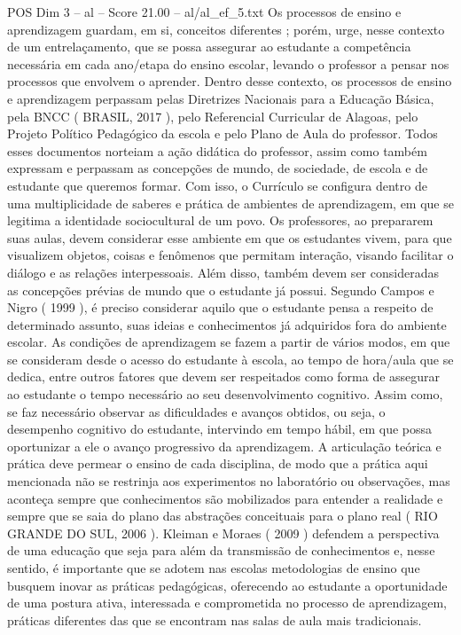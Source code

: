\begin{textsample}{POS Dim 3 – al – Score 21.00 – al/al\_ef\_5.txt}
Os processos de ensino e aprendizagem guardam, em si, conceitos diferentes ; porém, urge, nesse contexto de um entrelaçamento, que se possa assegurar ao estudante a competência necessária em cada ano/etapa do ensino escolar, levando o professor a pensar nos processos que envolvem o aprender.
Dentro desse contexto, os processos de ensino e aprendizagem perpassam pelas Diretrizes Nacionais para a Educação Básica, pela BNCC ( BRASIL, 2017 ), pelo Referencial Curricular de Alagoas, pelo Projeto Político Pedagógico da escola e pelo Plano de Aula do professor.
Todos esses documentos norteiam a ação didática do professor, assim como também expressam e perpassam as concepções de mundo, de sociedade, de escola e de estudante que queremos formar.
Com isso, o Currículo se configura dentro de uma multiplicidade de saberes e prática de ambientes de aprendizagem, em que se legitima a identidade sociocultural de um povo.
Os professores, ao prepararem suas aulas, devem considerar esse ambiente em que os estudantes vivem, para que visualizem objetos, coisas e fenômenos que permitam interação, visando facilitar o diálogo e as relações interpessoais.
Além disso, também devem ser consideradas as concepções prévias de mundo que o estudante já possui.
Segundo Campos e Nigro ( 1999 ), é preciso considerar aquilo que o estudante pensa a respeito de determinado assunto, suas ideias e conhecimentos já adquiridos fora do ambiente escolar.
As condições de aprendizagem se fazem a partir de vários modos, em que se consideram desde o acesso do estudante à escola, ao tempo de hora/aula que se dedica, entre outros fatores que devem ser respeitados como forma de assegurar ao estudante o tempo necessário ao seu desenvolvimento cognitivo.
Assim como, se faz necessário observar as dificuldades e avanços obtidos, ou seja, o desempenho cognitivo do estudante, intervindo em tempo hábil, em que possa oportunizar a ele o avanço progressivo da aprendizagem.
A articulação teórica e prática deve permear o ensino de cada disciplina, de modo que a prática aqui mencionada não se restrinja aos experimentos no laboratório ou observações, mas aconteça sempre que conhecimentos são mobilizados para entender a realidade e sempre que se saia do plano das abstrações conceituais para o plano real ( RIO GRANDE DO SUL, 2006 ).
Kleiman e Moraes ( 2009 ) defendem a perspectiva de uma educação que seja para além da transmissão de conhecimentos e, nesse sentido, é importante que se adotem nas escolas metodologias de ensino que busquem inovar as práticas pedagógicas, oferecendo ao estudante a oportunidade de uma postura ativa, interessada e comprometida no processo de aprendizagem, práticas diferentes das que se encontram nas salas de aula mais tradicionais.

\end{textsample}
